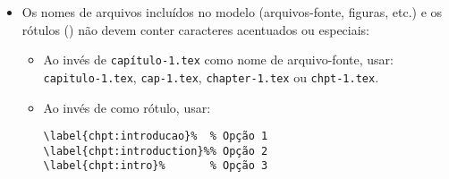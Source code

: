 \begin{itemize}
\item Os nomes de arquivos incluídos no modelo (arquivos-fonte, figuras, etc.) e os rótulos () não devem conter caracteres acentuados ou especiais:
\begin{itemize}
\item Ao invés de \texttt{capítulo-1.tex} como nome de arquivo-fonte, usar: \texttt{capitulo-1.tex}, \texttt{cap-1.tex}, \texttt{chapter-1.tex} ou \texttt{chpt-1.tex}.
\item Ao invés de  como rótulo, usar:
\begin{snugshade}
\begin{Verbatim}
\label{chpt:introducao}%  % Opção 1
\label{chpt:introduction}%% Opção 2
\label{chpt:intro}%       % Opção 3
\end{Verbatim}
\end{snugshade}
\end{itemize}
\end{itemize}
